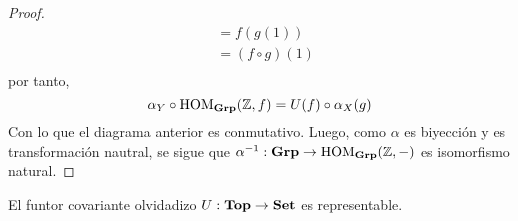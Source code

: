 \documentclass[12pt]{report}
\theoremstyle{largebreak}
\newcommand\cf[3]{\ensuremath{#1:#2\rightarrow#3}}
\newcommand{\Cat}[1]{\ensuremath{\textup{\textbf{#1}}}}
\begin{document}
\begin{proof}
\begin{equation*}
\begin{split}
                &=f(g(1))\\
                &=(f\circ g)(1)\\
            \end{split}
        \end{equation*}
        por tanto,
        \begin{equation*}
            \alpha_Y\circ\HOM{\Cat{Grp}}(\mathbb{Z},f)=U(f)\circ \alpha_X(g)
        \end{equation*}
        Con lo que el diagrama anterior es conmutativo. Luego, como $\alpha$ es biyección y es transformación nautral, se sigue que $\cf{\alpha^{-1}}{\Cat{Grp}}{\HOM{\Cat{Grp}}(\mathbb{Z},-)}$ es isomorfismo natural.
    \end{proof}

    \begin{exa}
        El funtor covariante olvidadizo $\cf{U}{\Cat{Top}}{\Cat{Set}}$ es representable.
    \end{exa}
\end{document}
